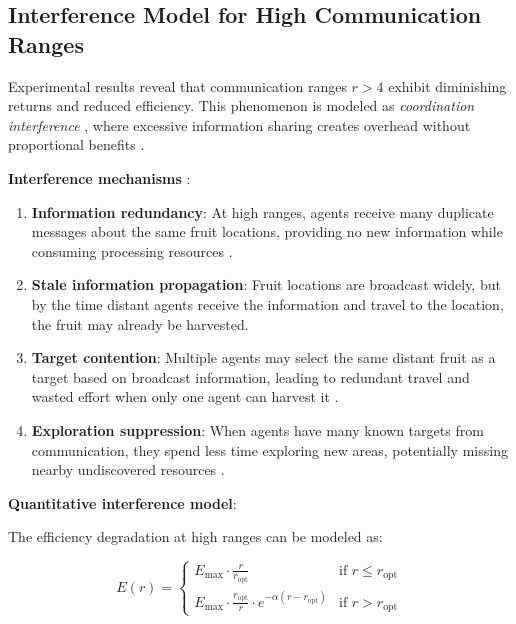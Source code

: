 \subsection{Interference Model for High Communication Ranges}

Experimental results reveal that communication ranges $r > 4$ exhibit diminishing returns and reduced efficiency. This phenomenon is modeled as \emph{coordination interference} \citep{lynch1996distributed}, where excessive information sharing creates overhead without proportional benefits \citep{farinelli2004multirobot}.

\textbf{Interference mechanisms} \citep{yan2013survey}:

\begin{enumerate}
    \item \textbf{Information redundancy}: At high ranges, agents receive many duplicate messages about the same fruit locations, providing no new information while consuming processing resources \citep{zhang2024}.

    \item \textbf{Stale information propagation}: Fruit locations are broadcast widely, but by the time distant agents receive the information and travel to the location, the fruit may already be harvested.

    \item \textbf{Target contention}: Multiple agents may select the same distant fruit as a target based on broadcast information, leading to redundant travel and wasted effort when only one agent can harvest it \citep{shell2006coordination}.

    \item \textbf{Exploration suppression}: When agents have many known targets from communication, they spend less time exploring new areas, potentially missing nearby undiscovered resources \citep{march1991exploration}.
\end{enumerate}

\textbf{Quantitative interference model}:

The efficiency degradation at high ranges can be modeled as:

\begin{equation}
E(r) = \begin{cases}
E_{\text{max}} \cdot \frac{r}{r_{\text{opt}}} & \text{if } r \le r_{\text{opt}} \\
E_{\text{max}} \cdot \frac{r_{\text{opt}}}{r} \cdot e^{-\alpha(r - r_{\text{opt}})} & \text{if } r > r_{\text{opt}}
\end{cases}
\end{equation}

